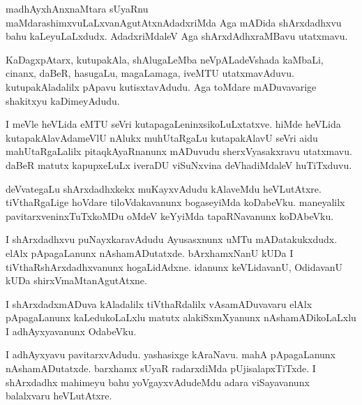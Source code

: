 \documentclass{article}
\begin{document}
\begin{mn}
madhAyxhAnxnaMtara sUyaRnu maMdarashimxvuLaLxvanAgutAtxnAdadxriMda Aga
mADida shArxdadhxvu bahu kaLeyuLaLxdudx. AdadxriMdaleV Aga
shArxdAdhxraMBavu utatxmavu.
\end{mn}

\begin{mn}%
KaDagxpAtarx, kutupakAla, shAlugaLeMba neVpALadeVshada kaMbaLi,
cinanx, daBeR, hasugaLu, magaLamaga, iveMTU
utatxmavAduvu. kutupakAladalilx pApavu kutisxtavAdudu. Aga toMdare
mADuvavarige shakitxyu kaDimeyAdudu.
\end{mn}

\begin{mn}%
I meVle heVLida eMTU seVri kutapagaLeninxsikoLuLxtatxve. hiMde heVLida
kutapakAlavAdameVlU nAlukx muhUtaRgaLu kutapakAlavU seVri aidu
mahUtaRgaLalilx pitaqkAyaRnanunx mADuvudu sherxVyasakxravu
utatxmavu. daBeR matutx kapupxeLuLx iveraDU viSuNxvina deVhadiMdaleV huTiTxduvu.
\end{mn}

\begin{mn}
deVvategaLu shArxdadhxkekx muKayxvAdudu kAlaveMdu
heVLutAtxre. tiVthaRgaLige hoVdare tiloVdakavanunx bogaseyiMda
koDabeVku. maneyalilx pavitarxveninxTuTxkoMDu oMdeV keYyiMda
tapaRNavanunx koDAbeVku.
\end{mn}

\begin{mn}%
I shArxdadhxvu puNayxkaravAdudu Ayusasxnunx uMTu mADatakukxdudx. elAlx
pApagaLanunx nAshamADutatxde. bArxhamxNanU kUDa I
tiVthaRshArxdadhxvanunx hogaLidAdxne. idanunx keVLidavanU, OdidavanU
kUDa shirxVmaMtanAgutAtxne.
\end{mn}

\begin{mn}%
I shArxdadxmADuva kAladalilx tiVthaRdalilx vAsamADuvavaru elAlx
pApagaLanunx kaLedukoLaLxlu matutx alakiSxmXyanunx nAshamADikoLaLxlu I
adhAyxyavanunx OdabeVku.
\end{mn}

\begin{mn}
I adhAyxyavu pavitarxvAdudu. yashasixge kAraNavu. mahA pApagaLanunx
nAshamADutatxde. barxhamx sUyaR radarxdiMda pUjisalapxTiTxde. I
shArxdadhx mahimeyu bahu yoVgayxvAdudeMdu adara viSayavanunx
balalxvaru heVLutAtxre.
\end{mn}

%
%
\end{document}
